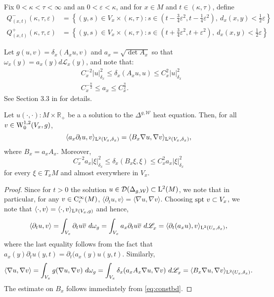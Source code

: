 \documentclass[AMS,STIX1COL]{WileyNJD-v2}
\numberwithin{equation}{section}
\renewcommand{\~}{\tilde}
\renewcommand{\-}{\bar}
\newcommand{\R}{\mathbb{R}}
\newcommand{\8}{\infty}
\newcommand{\cW}{\mathcal{W}}
\newcommand{\cbrac}[1]{\left(#1\right)}
\newcommand{\dbrac}[1]{\left\{#1\right\}}
\newcommand{\modulus}[1]{|#1|}
\newcommand{\set}[1]{\dbrac{#1}}
\newcommand{\dom}{ {\mathcal{D}}}
\newcommand{\script}[1]{\mathscr{#1}}
\renewcommand{\epsilon}{\varepsilon}
\newcommand{\spt}[1]{{\rm spt} {\text{ }}#1}	%
\newcommand{\inprod}[1]{\langle #1 \rangle}	%
\newcommand{\Leb}[1][{}]{\script{L}^{#1}}			%
\newcommand{\conj}[1]{\overline{#1}}				%
\newcommand{\Lp}[2][{}]{{\rm L}^{#2}_{\rm #1}}		%
\newcommand{\Ck}[2][{}]{{\rm C}^{#2}_{\rm #1}}		%
\newcommand{\Sob}[2][{}]{{\rm W}^{#2}_{\rm #1}}		%
\newcommand{\SobH}[2][{}]{{\Sob[#1]{#2,2}}}	%
\begin{document}
Fix $0 < \kappa < \tau < \infty$ and an $0 < \epsilon < \kappa$,
and for $x \in M$ and $t \in (\kappa, \tau)$, define
\begin{equation}
\label{eq:paradef}
\begin{split} 
Q^-_{(x,t)}(\kappa, \tau, \epsilon) &= \set{(y,s) \in V_x \times (\kappa,\tau): s \in \cbrac{t - \frac{3}{4}\epsilon^2, t - \frac{1}{4} \epsilon^2},\ 
	d_x(x,y) < \frac{1}{2} \epsilon} \\
Q^+_{(x,t)}(\kappa, \tau, \epsilon) &= \set{(y,s) \in V_x \times (\kappa,\tau): s \in \cbrac{t + \frac{3}{4}\epsilon^2, t + \epsilon^2},\ 
	d_x(x,y) < \frac{1}{2} \epsilon}
\end{split}
\end{equation}

Let $g(u,v) = \delta_x(A_x u,v)$
and $a_x = \sqrt{\det A_x}$ so that
$\omega_x(y) = a_x(y)d\Leb_x(y)$, and note
that:
\begin{equation}
\label{eq:constbd}
\begin{split}
&C_x^{-2} \modulus{u}_{\delta_x}^2 \leq \delta_x(A_x u, u) \leq C_x^2 \modulus{u}_{\delta_x}^2 \\
&C_x^{-\frac{n}{2}} \leq a_x \leq C_x^{\frac{n}{2}}.
\end{split}
\end{equation}
See Section 3.3 in \cite{BRough} for details. 

\begin{lemma}
\label{eq:soln1}
Let $u(\cdot, \cdot): M \times \R_+$  be a a solution to the $\Delta^{g,\cW}$ heat equation.
Then, for all $v \in \SobH[0]{1}(V_x,g)$, 
	\begin{equation} 
	\label{eq:testfn1}	 
	\inprod{a_x \partial_t u, v}_{\Lp{2}(V_x, \delta_x)} 
		= \inprod{ B_x \nabla u, \nabla v}_{\Lp{2}(V_x, \delta_x)},
	\end{equation}
where $B_x = a_x A_x$. Moreover,
\begin{equation}
\label{eq:coeff}
C_x^{-2} a_x \modulus{\xi}_{\delta_x}^2 \leq \delta_x(B_x \xi, \xi) 
	\leq C_x^2 a_x \modulus{\xi}_{\delta_x}^2
\end{equation} 
for every $\xi \in T_xM$ and almost everywhere in $V_x$. 
\end{lemma}
\begin{proof}
Since for $t > 0$ the solution $u \in \dom(\Delta_{g,\cW}) \subset \Lp{2}(M)$, we
note that in particular, for any $v \in \Ck[c]{\infty}(M)$, 
$\inprod{\partial_t u, v} = \inprod{\nabla u, \nabla v}$.
Choosing $\spt v \subset V_x$, we note that $\inprod{\cdot, v} = \inprod{\cdot, v}_{\Lp{2}(V_x,g)}$
and hence,
$$\inprod{\partial_t u, v} = \int_{V_x} \partial_t u\conj{v}\ d\omega_g 
	= \int_{V_x} a_x \partial_t  u \conj{v}\ d\Leb_x
	= \inprod{\partial_t (a_x u), v}_{\Lp{2}(U_x, \delta_x)},$$
where the last equality follows from the fact that 
$a_x(y) \partial_t u(y,t) = \partial_t (a_x(y)u(y,t).$
Similarly,
$$\inprod{\nabla u, \nabla v} 
	= \int_{V_x} g(\nabla u, \nabla v)\ d\omega_g
	= \int_{V_x} \delta_x(a_x A_x \nabla u, \nabla v)\ d\Leb_x
	= \inprod{B_x \nabla u, \nabla v}_{\Lp{2}(U_x, \delta_x)}.$$
The estimate on $B_x$ follows immediately from
\eqref{eq:constbd}.
\end{proof} 
\end{document}
